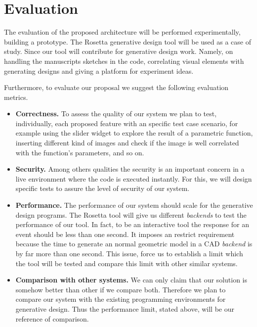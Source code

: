 
% 
% 
\section{Evaluation}
\label{sec:eval}

The evaluation of the proposed architecture will be performed experimentally, building a prototype. The Rosetta generative design tool will be used as a case of study. Since our tool will contribute for generative design work. Namely, on handling the manuscripts sketches in the code, correlating visual elements with generating designs and giving a platform for experiment ideas.

Furthermore, to evaluate our proposal we suggest the following evaluation metrics.

\begin{itemize}
\item \textbf{Correctness.} To assess the quality of our system we plan to test, individually, each proposed feature with an specific test case scenario, for example using the slider widget to explore the result of a parametric function, inserting different kind of images and check if the image is well correlated with the function's parameters, and so on. 

\item \textbf{Security.} Among others qualities the security is an important concern in a live environment where the code is executed instantly. For this, we will design specific tests to assure the level of security of our system.

\item \textbf{Performance.} The performance of our system should scale for the generative design programs. The Rosetta tool will give us different \textit{backends} to test the performance of our tool. In fact, to be an interactive tool the response for an event should be less than one second. It imposes an restrict requirement because the time to generate an normal geometric model in a CAD \textit{backend} is by far more than one second. This issue, force us to establish a limit which the tool will be tested and compare this limit with other similar systems.

\item \textbf{Comparison with other systems.} We can only claim that our solution is somehow better than other if we compare both. Therefore we plan to compare our system with the existing programming environments for generative design. Thus the performance limit, stated above, will be our reference of comparison.
\end{itemize}